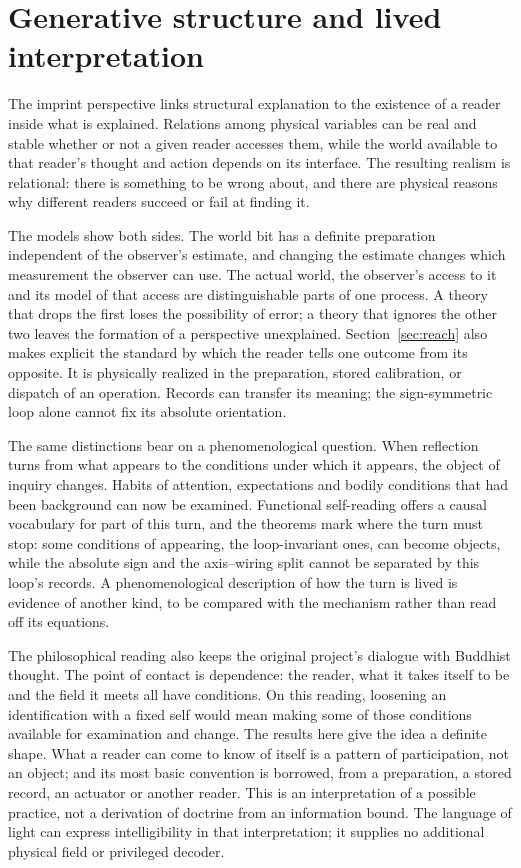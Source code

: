 \documentclass[11pt,a4paper]{article}
\begin{document}
\section{Generative structure and lived interpretation}\label{sec:interpretation}

The imprint perspective links structural explanation to the existence of a reader inside what is explained. Relations among physical variables can be real and stable whether or not a given reader accesses them, while the world available to that reader's thought and action depends on its interface. The resulting realism is relational: there is something to be wrong about, and there are physical reasons why different readers succeed or fail at finding it.

The models show both sides. The world bit has a definite preparation independent of the observer's estimate, and changing the estimate changes which measurement the observer can use. The actual world, the observer's access to it and its model of that access are distinguishable parts of one process. A theory that drops the first loses the possibility of error; a theory that ignores the other two leaves the formation of a perspective unexplained. Section~\ref{sec:reach} also makes explicit the standard by which the reader tells one outcome from its opposite. It is physically realized in the preparation, stored calibration, or dispatch of an operation. Records can transfer its meaning; the sign-symmetric loop alone cannot fix its absolute orientation.

The same distinctions bear on a phenomenological question. When reflection turns from what appears to the conditions under which it appears, the object of inquiry changes. Habits of attention, expectations and bodily conditions that had been background can now be examined. Functional self-reading offers a causal vocabulary for part of this turn, and the theorems mark where the turn must stop: some conditions of appearing, the loop-invariant ones, can become objects, while the absolute sign and the axis--wiring split cannot be separated by this loop's records. A phenomenological description of how the turn is lived is evidence of another kind, to be compared with the mechanism rather than read off its equations.

The philosophical reading also keeps the original project's dialogue with Buddhist thought. The point of contact is dependence: the reader, what it takes itself to be and the field it meets all have conditions. On this reading, loosening an identification with a fixed self would mean making some of those conditions available for examination and change. The results here give the idea a definite shape. What a reader can come to know of itself is a pattern of participation, not an object; and its most basic convention is borrowed, from a preparation, a stored record, an actuator or another reader. This is an interpretation of a possible practice, not a derivation of doctrine from an information bound. The language of light can express intelligibility in that interpretation; it supplies no additional physical field or privileged decoder.
\end{document}
